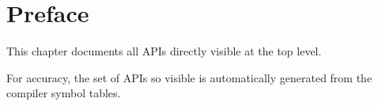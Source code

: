 \section{Preface}

%
%

\label{section:ref:api:preface}

This chapter documents all APIs directly visible at the top level.

For accuracy, the set of APIs so visible is automatically generated from the 
compiler symbol tables.

